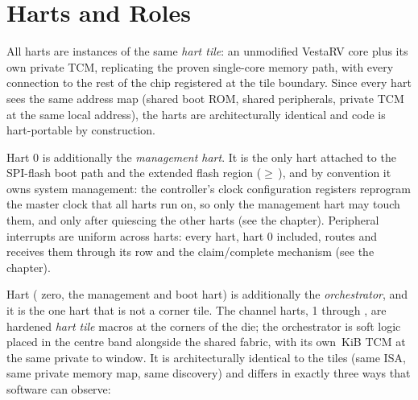 \section{Harts and Roles}

All \NumHartsWord{} harts are instances of the same \textit{hart tile}: an unmodified VestaRV core plus its own private TCM, replicating the proven single-core memory path, with every connection to the rest of the chip registered at the tile boundary. Since every hart sees the same address map (shared boot ROM, shared peripherals, private TCM at the same local address), the \NumHartsWord{} harts are architecturally identical and code is hart-portable by construction.

Hart 0 is additionally the \textit{management hart}.{} It is the only hart attached to the SPI-flash boot path and the extended flash region ($\geq$\,\texttt{\FlashBaseAddress}), and by convention it owns system management: the  controller's clock configuration registers reprogram the master clock that all \NumHartsWord{} harts run on, so only the management hart may touch them, and only after quiescing the other harts (see the  chapter). Peripheral interrupts are uniform across harts: every hart, hart 0 included, routes and receives them through its  row and the claim/complete mechanism (see the  chapter).

\iforchpresent
Hart \OrchHartIndex{} ( zero, the management and boot hart) is additionally the \textit{orchestrator}, and it is the one hart that is not a corner tile. The channel harts,  1 through \MaxHartIndex{}, are hardened \textit{hart tile} macros at the corners of the die; the orchestrator is soft logic placed in the centre band alongside the shared fabric, with its own \TcmSizeKiB\,KiB TCM at the same private \texttt{\RamStartAddress} to \texttt{\RamEndAddress} window. It is architecturally identical to the tiles (same ISA, same private memory map, same  discovery) and differs in exactly three ways that software can observe:

